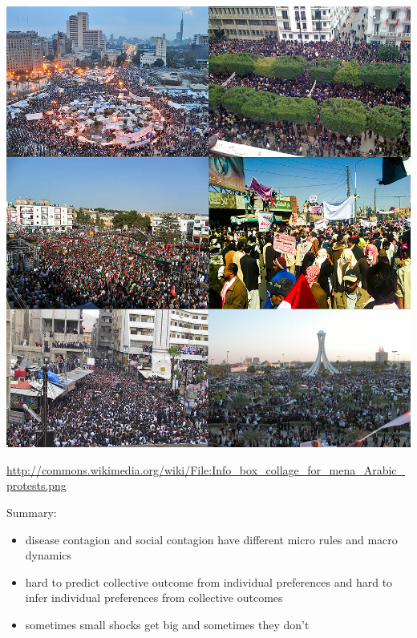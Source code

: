 \documentclass[aspectratio=169]{beamer}
\begin{document}
\begin{frame}

\begin{center}
\includegraphics[height=0.8\textheight]{figures/arab_spring}
\end{center}

\tiny{\url{http://commons.wikimedia.org/wiki/File:Info_box_collage_for_mena_Arabic_protests.png}}


\end{frame}
\begin{frame}

Summary:
\begin{itemize}
\item disease contagion and social contagion have different micro rules and macro dynamics
\pause
\item hard to predict collective outcome from individual preferences and hard to infer individual preferences from collective outcomes
\pause
\item sometimes small shocks get big and sometimes they don't
\end{itemize}

\end{frame}
\end{document}
